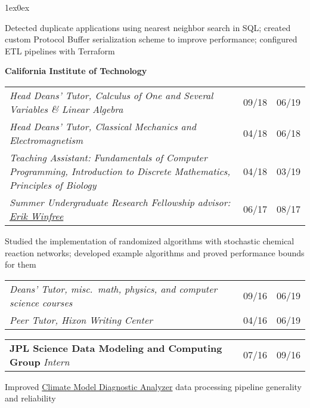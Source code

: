 \documentclass[12pt]{article}
\def\myh{20pt}
\def\indentlen{1ex}
\newcommand{\datecolor}{lavender3}
\let\oldbold\textbf
\renewcommand{\textbf}[1]{\oldbold{\color{boldpurple} #1}}
\let\olditalic\textit
\renewcommand{\textit}[1]{\olditalic{\color{lavender} #1}}
\newcommand{\textittwo}[1]{\olditalic{\color{lavender2} #1}}
\newcommand{\mysmallerverticalspace}{\vspace{4pt}}
\newcommand{\datecolwidth}{29pt}
\newcommand{\titlecolwidth}{\textwidth - \datecolwidth*3 + \myh/2 - 5pt}
\begin{document}
{\begin{adjustwidth}{\indentlen}{0ex}
\color{normaltext}

Detected duplicate applications using nearest neighbor search in SQL; created custom Protocol Buffer serialization
scheme to improve performance; configured ETL pipelines with Terraform

\mysmallerverticalspace

\textbf{\hspace{-\indentlen}California Institute of Technology}

\color{\datecolor}

\begin{tabular}{@{}p{\titlecolwidth}r@{|}p{\datecolwidth}@{}}
\textit{Head Deans' Tutor, Calculus of One and Several Variables \& Linear Algebra} & 09/18 & 06/19 \\
\textit{Head Deans' Tutor, Classical Mechanics and Electromagnetism} & 04/18 & 06/18 \\
\textit{Teaching Assistant: Fundamentals of Computer Programming, \newline \hspace*{\rolesep} Introduction to Discrete Mathematics, Principles of Biology} & 04/18 & 03/19 \\
\textit{Summer Undergraduate Research Fellowship} \hspace{\rolesep} \textittwo{advisor: \href{https://www.dna.caltech.edu/~winfree/}{Erik Winfree}} & 06/17 & 08/17
\end{tabular}

\color{normaltext}

Studied the implementation of randomized algorithms with stochastic chemical reaction
networks; developed example algorithms and proved performance bounds for them

\mysmallerverticalspace

\color{\datecolor}

\begin{tabular}{@{}p{\titlecolwidth}r@{|}p{\datecolwidth}@{}}
\textit{Deans' Tutor, misc.\ math, physics, and computer science courses} & 09/16 & 06/19 \\
\textit{Peer Tutor, Hixon Writing Center} & 04/16 & 06/19
\end{tabular}

\mysmallerverticalspace

\begin{tabular}{@{}p{\titlecolwidth}r@{|}p{\datecolwidth}@{}}
\textbf{\hspace{-\indentlen}JPL Science Data Modeling and Computing Group} \hspace{\rolesep} \textit{Intern} & 07/16 & 09/16
\end{tabular}

\color{normaltext}

Improved \href{https://jpl-cmda.org/ccs.html}{Climate Model Diagnostic Analyzer} data processing pipeline generality and reliability

\end{adjustwidth}

\color{normaltext}
\vspace{-2pt}
}
\end{document}
